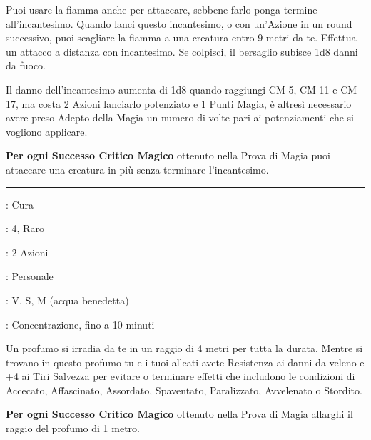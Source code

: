 \begin{multicols}{2}
Puoi usare la fiamma anche per attaccare, sebbene farlo ponga termine all'incantesimo. Quando lanci questo incantesimo, o con un'Azione in un round successivo, puoi scagliare la fiamma a una creatura entro 9 metri da te. Effettua un attacco a distanza con incantesimo. Se colpisci, il bersaglio subisce 1d8 danni da fuoco.

Il danno dell'incantesimo aumenta di 1d8 quando raggiungi CM 5, CM 11 e CM 17, ma costa 2 Azioni lanciarlo potenziato e 1 Punti Magia, è altresì necessario avere preso Adepto della Magia un numero di volte pari ai potenziamenti che si vogliono applicare.

\textbf{Per ogni Successo Critico Magico} ottenuto nella Prova di Magia puoi attaccare una creatura in più senza terminare l'incantesimo.

\smallskip\noindent\rule{\linewidth}{2pt} \hypertarget{Profumo di Atherim}{}\smallskip{}\label{Aura of Purity}
\noindent
\begin{description}[noitemsep, topsep=0pt, parsep=0pt, partopsep=0pt, leftmargin=0cm, labelwidth=2.8cm]
	\item[\textbf{Lista di Magia}] : Cura
	\item[\textbf{Livello}] : 4, Raro
	\item[\textbf{T. di Lancio}] : 2 Azioni
	\item[\textbf{Gittata}] : Personale
	\item[\textbf{Componenti}] : V, S, M (acqua benedetta)
	\item[\textbf{Durata}] : Concentrazione, fino a 10 minuti
\end{description}

Un profumo si irradia da te in un raggio di 4 metri per tutta la durata. Mentre si trovano in questo profumo tu e i tuoi alleati avete Resistenza ai danni da veleno e +4 ai Tiri Salvezza per evitare o terminare effetti che includono le condizioni di Accecato, Affascinato, Assordato, Spaventato, Paralizzato, Avvelenato o Stordito.

\textbf{Per ogni Successo Critico Magico} ottenuto nella Prova di Magia allarghi il raggio del profumo di 1 metro.


\end{multicols}
